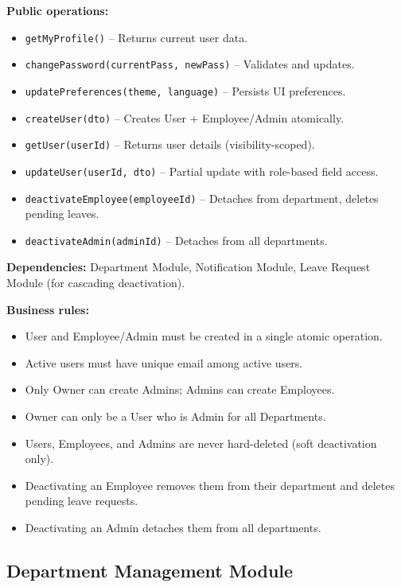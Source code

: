 \documentclass[11pt,a4paper]{article}
\begin{document}
\textbf{Public operations:}
\begin{itemize}[leftmargin=1.5em]
    \item \texttt{getMyProfile()} -- Returns current user data.
    \item \texttt{changePassword(currentPass, newPass)} -- Validates and updates.
    \item \texttt{updatePreferences(theme, language)} -- Persists UI preferences.
    \item \texttt{createUser(dto)} -- Creates User + Employee/Admin atomically.
    \item \texttt{getUser(userId)} -- Returns user details (visibility-scoped).
    \item \texttt{updateUser(userId, dto)} -- Partial update with role-based field access.
    \item \texttt{deactivateEmployee(employeeId)} -- Detaches from department, deletes pending leaves.
    \item \texttt{deactivateAdmin(adminId)} -- Detaches from all departments.
\end{itemize}

\textbf{Dependencies:} Department Module, Notification Module, Leave Request Module (for cascading deactivation).

\textbf{Business rules:}
\begin{itemize}[leftmargin=1.5em]
    \item User and Employee/Admin must be created in a single atomic operation.
    \item Active users must have unique email among active users.
    \item Only Owner can create Admins; Admins can create Employees.
    \item Owner can only be a User who is Admin for all Departments.
    \item Users, Employees, and Admins are never hard-deleted (soft deactivation only).
    \item Deactivating an Employee removes them from their department and deletes pending leave requests.
    \item Deactivating an Admin detaches them from all departments.
\end{itemize}

\subsection{Department Management Module}
\end{document}
